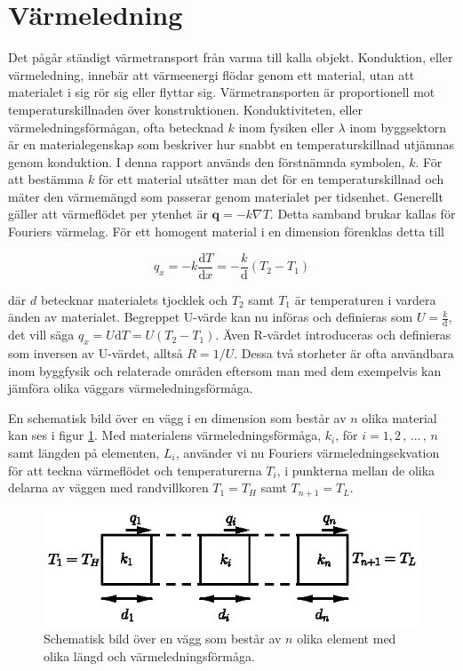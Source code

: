 \section{Värmeledning}
\label{sec:heatconduction}

Det pågår ständigt värmetransport från varma till kalla objekt. Konduktion, eller värmeledning, innebär att värmeenergi flödar genom ett material, utan att materialet i sig rör sig eller flyttar sig. Värmetransporten är proportionell mot temperaturskillnaden över konstruktionen. Konduktiviteten, eller värmeledningsförmågan, ofta betecknad $k$ inom fysiken eller $\lambda$ inom byggsektorn är en materialegenskap som beskriver hur snabbt en temperaturskillnad utjämnas genom konduktion. I denna rapport används den förstnämnda symbolen, $k$. För att bestämma $k$ för ett material utsätter man det för en temperaturskillnad och mäter den värmemängd som passerar genom materialet per tidsenhet. Generellt gäller att värmeflödet per ytenhet är $\mathbf{q} = - k \nabla T$. Detta samband brukar kallas för Fouriers värmelag. För ett homogent material i en dimension förenklas detta till

\begin{equation}\label{eq:conduction:fourier}\boxed{ \; \; \;
q_x = -k \frac{\mathrm{d}T}{\mathrm{d}x} = -\frac{k}{\mathrm{d}}\left( T_2-T_1\right)
\; \; \; }
\end{equation}

där $d$ betecknar materialets tjocklek och $T_2$ samt $T_1$ är temperaturen i vardera änden av materialet. Begreppet U-värde kan nu införas och definieras som $U = \frac{k}{\mathrm{d}}$, det vill säga $q_x = U\mathrm{d}T = U\left( T_2-T_1 \right)$. Även R-värdet introduceras och definieras som inversen av U-värdet, alltså $R=1/U$. Dessa två storheter är ofta användbara inom byggfysik och relaterade områden eftersom man med dem exempelvis kan jämföra olika väggars värmeledningsförmåga.

En schematisk bild över en vägg i en dimension som består av $n$ olika material kan ses i figur \ref{fig:staticwallmethod:wall}. Med materialens värmeledningsförmåga, $k_i$, för $i=1,2\,,\,...\,,\,n$ samt längden på elementen, $L_i$, använder vi nu Fouriers värmeledningsekvation för att teckna värmeflödet och temperaturerna $T_i$, i punkterna mellan de olika delarna av väggen med randvillkoren $T_1 = T_H$ samt $T_{n+1} = T_L$.

\begin{figure}[hpbt]
\centering
\includegraphics[scale=1.2]{images/wall.eps}
\caption{Schematisk bild över en vägg som består av $n$ olika element med olika
längd och värmeledningsförmåga.}\label{fig:staticwallmethod:wall}
\end{figure}

